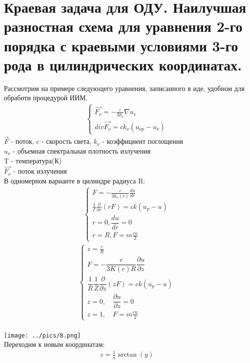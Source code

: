\documentclass[12pt,a4paper]{article}
\begin{document}
	\section{Краевая задача для ОДУ. Наилучшая разностная схема для уравнения 2-го порядка с краевыми условиями 3-го рода в цилиндрических координатах.}
	Рассмотрим на примере следующего уравнения, записанного в иде, удобном для обработи процедурой ИИМ.\\
	\begin{align*}
	\begin{cases}
	\vec{F_\nu} = - \frac{c}{3k_\nu}\nabla u_v\\
	div \vec{F_\nu} = c k_\nu (u_{\nu p} - u_\nu)
 	\end{cases}
	\end{align*}
	$\vec{F}$ - поток, c - скорость света, $k_\nu$ - коэффициент поглощения\\
	$u_\nu$ - объемная спектральная плотность излучения\\
	T - температура(К)\\
	$\vec{F_\nu}$ - поток излучения\\
	В одномерном варианте в цилиндре радиуса R:\\
	\begin{align*}
	\begin{cases}
	F = - \displaystyle\frac{c}{3k_\nu(r) }\frac{du}{dr}\\
	\frac{1}{\varGamma}\displaystyle\frac{\partial}{\partial r}(rF) = c k (u_p - u)\\
	r = 0, \dfrac{du}{dr} = 0\\
	r = R, F = m \frac{cu}{2}
	\end{cases}
	\end{align*}
	\begin{align*}
	\begin{cases}
	z = \frac{r}{R}\\
	F = - \dfrac{c}{3K(r)R} \dfrac{\partial u}{\partial z}\\
	\dfrac{1}{R}\dfrac{1}{Z} \dfrac{\partial}{\partial z}(zF)=c k (u_p - u)\\
	z = 0, \quad \dfrac{\partial u}{\partial z} = 0 \\
	z = 1, \quad F = m \frac{cu}{2}
	\end{cases}
	\end{align*}\\
	\texttt{[image: ../pics/8.png]}\\
	Переходим к новым координатам:\\
	\begin{align*}
	z = \frac{1}{a} \arctan (y)
	\end{align*}\\
\end{document}
